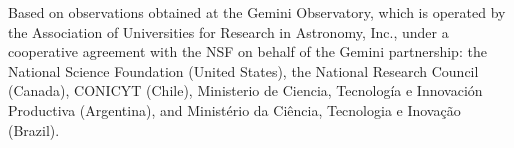 \documentclass[baaa]{baaa}
\begin{document}
\begin{acknowledgement}
Based on observations obtained at the Gemini Observatory, which is operated by the Association of Universities for Research in Astronomy, Inc., under a cooperative agreement with the NSF on behalf of the Gemini partnership: the National Science Foundation (United States), the National Research Council (Canada), CONICYT (Chile), Ministerio de Ciencia, Tecnolog\'{i}a e Innovaci\'{o}n Productiva (Argentina), and Minist\'{e}rio da Ci\^{e}ncia, Tecnologia e Inova\c{c}\~{a}o (Brazil).
\end{acknowledgement}



\small

 
\end{document}
